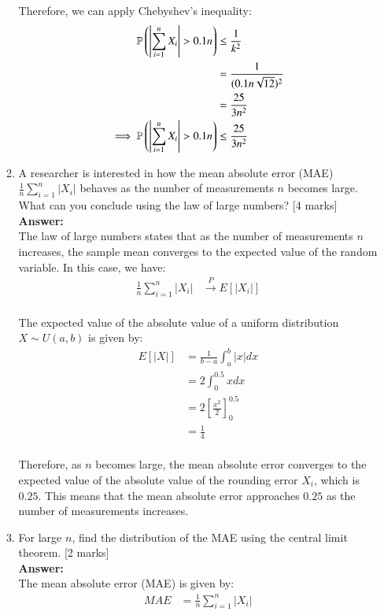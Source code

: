 \documentclass[12pt]{article}
\begin{document}
\begin{enumerate}
\begin{enumerate}
Therefore, we can apply Chebyshev's inequality:
\begin{align*}
{\mathbb P}\left(\left|\sum_{i=1}^n X_i\right| > 0.1 n\right) &\leq \frac{1}{k^2} \\
&= \frac{1}{(0.1 n \sqrt{12})^2} \\
&= \frac{25}{3 n^2} \\
\implies {\mathbb P}\left(\left|\sum_{i=1}^n X_i\right| > 0.1 n\right) &\leq \frac{25}{3 n^2} \\
\end{align*}
%

\item A researcher is interested in how the mean absolute error (MAE) $\frac{1}{n} \sum_{i=1}^n |X_i|$ behaves as the number of measurements $n$ becomes large. What can you conclude using the law of large numbers?
			\hfill [4 marks]
%
\\
\textbf{Answer:}
\\
The law of large numbers states that as the number of measurements $n$ increases, the sample mean converges to the expected value of the random variable. In this case, we have:
\begin{align*}
\frac{1}{n} \sum_{i=1}^n |X_i| &\xrightarrow{P} E[|X_i|] \\
\end{align*}

The expected value of the absolute value of a uniform distribution $X \sim U(a, b)$ is given by:
\begin{align*}
E[|X|] &= \frac{1}{b-a} \int_a^b |x| dx \\
&= 2\int_0^{0.5} x dx \\
&= 2\left[\frac{x^2}{2}\right]_0^{0.5} \\
&= \frac{1}{4} \\
\end{align*}

Therefore, as $n$ becomes large, the mean absolute error converges to the expected value of the absolute value of the rounding error $X_i$, which is $0.25$. This means that the mean absolute error approaches $0.25$ as the number of measurements increases.
%

\item For large $n$, find the distribution of the MAE using the central limit theorem. 
			\hfill [2 marks]
%
\\
\textbf{Answer:}
\\
The mean absolute error (MAE) is given by:
\begin{align*}
MAE &= \frac{1}{n} \sum_{i=1}^n |X_i|
\end{align*}


\end{enumerate}
\end{enumerate}
\end{document}

